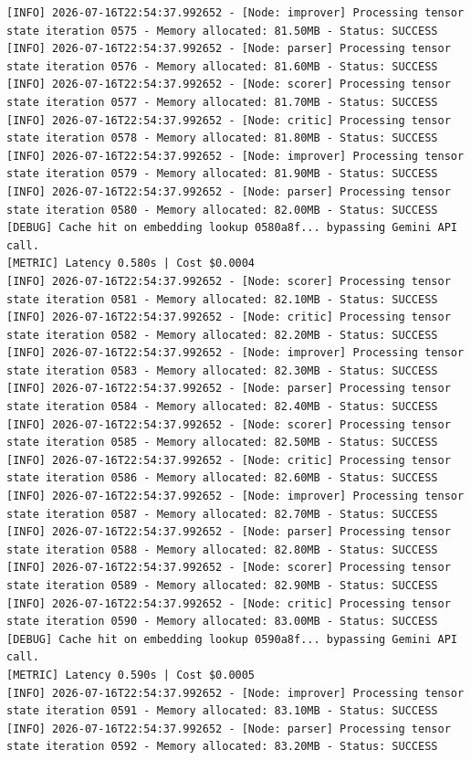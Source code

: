 \documentclass[10pt,journal,compsoc]{IEEEtran}
\begin{document}
\begin{verbatim}
[INFO] 2026-07-16T22:54:37.992652 - [Node: improver] Processing tensor state iteration 0575 - Memory allocated: 81.50MB - Status: SUCCESS
[INFO] 2026-07-16T22:54:37.992652 - [Node: parser] Processing tensor state iteration 0576 - Memory allocated: 81.60MB - Status: SUCCESS
[INFO] 2026-07-16T22:54:37.992652 - [Node: scorer] Processing tensor state iteration 0577 - Memory allocated: 81.70MB - Status: SUCCESS
[INFO] 2026-07-16T22:54:37.992652 - [Node: critic] Processing tensor state iteration 0578 - Memory allocated: 81.80MB - Status: SUCCESS
[INFO] 2026-07-16T22:54:37.992652 - [Node: improver] Processing tensor state iteration 0579 - Memory allocated: 81.90MB - Status: SUCCESS
[INFO] 2026-07-16T22:54:37.992652 - [Node: parser] Processing tensor state iteration 0580 - Memory allocated: 82.00MB - Status: SUCCESS
[DEBUG] Cache hit on embedding lookup 0580a8f... bypassing Gemini API call.
[METRIC] Latency 0.580s | Cost $0.0004
[INFO] 2026-07-16T22:54:37.992652 - [Node: scorer] Processing tensor state iteration 0581 - Memory allocated: 82.10MB - Status: SUCCESS
[INFO] 2026-07-16T22:54:37.992652 - [Node: critic] Processing tensor state iteration 0582 - Memory allocated: 82.20MB - Status: SUCCESS
[INFO] 2026-07-16T22:54:37.992652 - [Node: improver] Processing tensor state iteration 0583 - Memory allocated: 82.30MB - Status: SUCCESS
[INFO] 2026-07-16T22:54:37.992652 - [Node: parser] Processing tensor state iteration 0584 - Memory allocated: 82.40MB - Status: SUCCESS
[INFO] 2026-07-16T22:54:37.992652 - [Node: scorer] Processing tensor state iteration 0585 - Memory allocated: 82.50MB - Status: SUCCESS
[INFO] 2026-07-16T22:54:37.992652 - [Node: critic] Processing tensor state iteration 0586 - Memory allocated: 82.60MB - Status: SUCCESS
[INFO] 2026-07-16T22:54:37.992652 - [Node: improver] Processing tensor state iteration 0587 - Memory allocated: 82.70MB - Status: SUCCESS
[INFO] 2026-07-16T22:54:37.992652 - [Node: parser] Processing tensor state iteration 0588 - Memory allocated: 82.80MB - Status: SUCCESS
[INFO] 2026-07-16T22:54:37.992652 - [Node: scorer] Processing tensor state iteration 0589 - Memory allocated: 82.90MB - Status: SUCCESS
[INFO] 2026-07-16T22:54:37.992652 - [Node: critic] Processing tensor state iteration 0590 - Memory allocated: 83.00MB - Status: SUCCESS
[DEBUG] Cache hit on embedding lookup 0590a8f... bypassing Gemini API call.
[METRIC] Latency 0.590s | Cost $0.0005
[INFO] 2026-07-16T22:54:37.992652 - [Node: improver] Processing tensor state iteration 0591 - Memory allocated: 83.10MB - Status: SUCCESS
[INFO] 2026-07-16T22:54:37.992652 - [Node: parser] Processing tensor state iteration 0592 - Memory allocated: 83.20MB - Status: SUCCESS

\end{verbatim}
\end{document}
